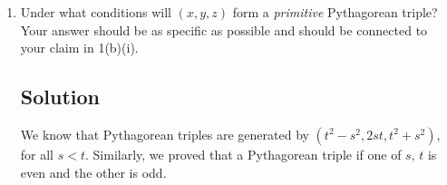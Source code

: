 \documentclass[12pt]{amsart}
\begin{document}
\begin{enumerate}
\begin{enumerate}
\begin{enumerate}
\subsection*{Claim}
If $F_n$ is a Fibonacci number, then,
%
\[ (F_n\cdot F_{n+3}, 2F_{n+1} \cdot F_{n+2}, F_{n+1}^2 + F_{n+2}^2)\]
%
is a Pythagorean triple.

\begin{proof}
We will proceed by induction on $n$.

Base case: When $n=1$, we know that $F_1 = F_2 = 1$, $F_3 = 2$, and $F_4 = 3$. So we have:
%
\begin{align*}
(F_1\cdot F_{4}, 2F_{2}\cdot F_{3}, F_{2}^2 + F_{3}^2) &= (1\cdot 3, 2\cdot 1 \cdot 2, 1^2 + 2^2) \\
&= (3, 4, 5)
\end{align*}
%
Which is clearly a Pythagorean triple, since $3^2+4^2 = 5^2$.

\bigskip

Inductive case: Assume the claim holds for $F_k$. We want to show it also holds for $F_{k+1}$. In other words, assuming that,
%
\[ (F_k\cdot F_{k+3}, 2F_{k+1} \cdot F_{k+2}, F_{k+1}^2 + F_{k+2}^2)\]
%
is a Pythagorean triple, we want to show that,
%
\[ (F_{k+1}\cdot F_{k+4}, 2F_{k+2} \cdot F_{k+3}, F_{k+2}^2 + F_{k+3}^2)\]
%
is also a Pythagorean triple.

This means that we need to show:
%
\[ (F_{k+1}\cdot F_{k+4})^2 + (2F_{k+2} \cdot F_{k+3})^2 = (F_{k+2}^2 + F_{k+3}^2)^2. \]
%

Observe that:
\begin{align*}
(F_{k+1}\cdot F_{k+4})^2 + (2F_{k+2} \cdot F_{k+3})^2 &= \ldots \\
\\
&= F_{k+2}^4 + 2\cdot F_{k+2}^2 \cdot F_{k+3}^2 + F_{k+3}^4 \\
&= (F_{k+2}^2 + F_{k+3}^2)^2
\end{align*}
\end{proof}

\item Under what conditions will $(x,y,z)$ form a {\it primitive} Pythagorean triple? Your answer should be as specific as possible and should be connected to your claim in 1(b)(i).

\subsection*{Solution}
We know that Pythagorean triples are generated by $(t^2 - s^2, 2st, t^2 + s^2)$, for all $s<t$. Similarly, we proved that a Pythagorean triple if one of $s,\,t$ is even and the other is odd.


\end{enumerate}
\end{enumerate}
\end{enumerate}
\end{document}
